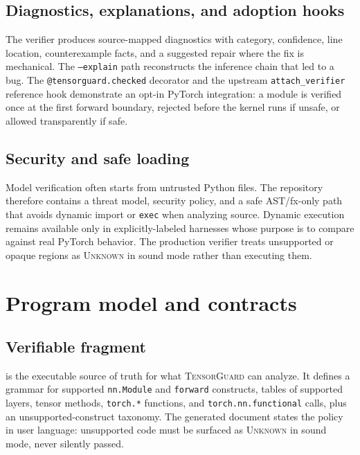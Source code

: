 \documentclass[11pt]{article}
\newcommand{\tg}{\textsc{TensorGuard}}
\newcommand{\unknown}{\textsc{Unknown}}
\begin{document}
\subsection{Diagnostics, explanations, and adoption hooks}

The verifier produces source-mapped diagnostics with category, confidence, line
location, counterexample facts, and a suggested repair where the fix is
mechanical.  The \texttt{--explain} path reconstructs the inference chain that
led to a bug.  The \texttt{@tensorguard.checked} decorator and the upstream
\texttt{attach\_verifier} reference hook demonstrate an opt-in PyTorch
integration: a module is verified once at the first forward boundary, rejected
before the kernel runs if unsafe, or allowed transparently if safe.

\subsection{Security and safe loading}

Model verification often starts from untrusted Python files.  The repository
therefore contains a threat model, security policy, and a safe AST/fx-only path
that avoids dynamic import or \texttt{exec} when analyzing source.  Dynamic
execution remains available only in explicitly-labeled harnesses whose purpose
is to compare against real PyTorch behavior.  The production verifier treats
unsupported or opaque regions as \unknown{} in sound mode rather than executing
them.

\section{Program model and contracts}

\subsection{Verifiable fragment}

 is the executable source of truth for what
\tg{} can analyze.  It defines a grammar for supported \texttt{nn.Module} and
\texttt{forward} constructs, tables of supported layers, tensor methods,
\texttt{torch.*} functions, and \texttt{torch.nn.functional} calls, plus an
unsupported-construct taxonomy.  The generated document
 states the policy in user language:
unsupported code must be surfaced as \unknown{} in sound mode, never silently
passed.
\end{document}
